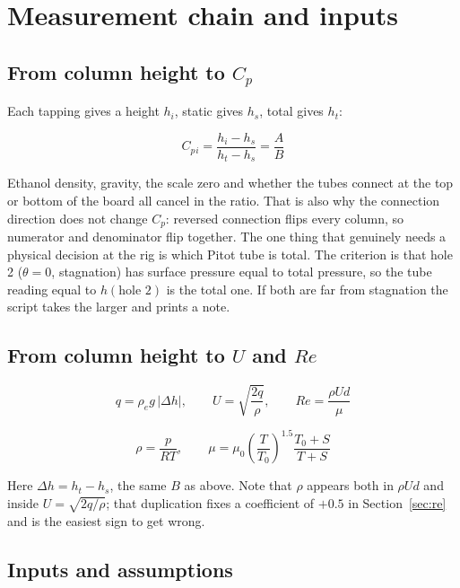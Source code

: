 \documentclass[11pt,a4paper]{article}
\newcommand{\Cp}{\ensuremath{C_p}}
\newcommand{\ReD}{\ensuremath{\mathit{Re}}}
\begin{document}
\section{Measurement chain and inputs}

\subsection{From column height to \Cp}

Each tapping gives a height $h_i$, static gives $h_s$, total gives $h_t$:

\begin{equation}
\Cp{}_i = \frac{h_i - h_s}{h_t - h_s} = \frac{A}{B}
\end{equation}

Ethanol density, gravity, the scale zero and whether the tubes connect at the top or bottom of the
board all cancel in the ratio. That is also why the connection direction does not change \Cp:
reversed connection flips every column, so numerator and denominator flip together. The one thing
that genuinely needs a physical decision at the rig is which Pitot tube is total. The criterion is
that hole 2 ($\theta = 0$, stagnation) has surface pressure equal to total pressure, so the tube
reading equal to $h(\text{hole } 2)$ is the total one. If both are far from stagnation the script
takes the larger and prints a note.

\subsection{From column height to $U$ and \ReD}

\begin{equation}
q = \rho_e g\,|\Delta h|, \qquad U = \sqrt{\frac{2q}{\rho}}, \qquad \ReD = \frac{\rho U d}{\mu}
\end{equation}

\begin{equation}
\rho = \frac{p}{RT}, \qquad \mu = \mu_0\left(\frac{T}{T_0}\right)^{1.5}\frac{T_0 + S}{T + S}
\end{equation}

Here $\Delta h = h_t - h_s$, the same $B$ as above. Note that $\rho$ appears both in $\rho U d$ and
inside $U = \sqrt{2q/\rho}$; that duplication fixes a coefficient of $+0.5$ in Section~\ref{sec:re}
and is the easiest sign to get wrong.

\subsection{Inputs and assumptions}
\end{document}
